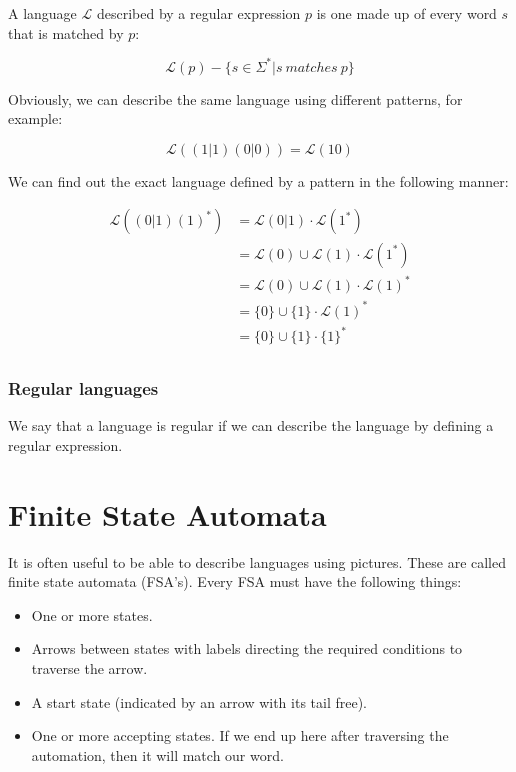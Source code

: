 A language $\mathcal{L}$ described by a regular expression $p$ is one made up of
every word $s$ that is matched by $p$:

\[
  \mathcal{L}(p) - \{s \in \Sigma^* | s~matches~p\}
\]

Obviously, we can describe the same language using different patterns, for
example:

\[
  \mathcal{L}((1|1)(0|0)) = \mathcal{L}(10)
\]

We can find out the exact language defined by a pattern in the following manner:

\[
  \begin{split}
    \mathcal{L}((0|1)(1)^*) &= \mathcal{L}(0|1) \cdot \mathcal{L}(1^*)\\
                &= \mathcal{L}(0) \cup \mathcal{L}(1) \cdot \mathcal{L}(1^*)\\
                &= \mathcal{L}(0) \cup \mathcal{L}(1) \cdot \mathcal{L}(1)^*\\
                &= \{0\} \cup \{1\} \cdot \mathcal{L}(1)^*\\
                &= \{0\} \cup \{1\} \cdot \{1\}^*\\
  \end{split}
\]

\subsubsection{Regular languages}

We say that a language is regular if we can describe the language by defining a
regular expression.

\section{Finite State Automata}

It is often useful to be able to describe languages using pictures. These are
called finite state automata (FSA's). Every FSA must have the following things:

\begin{itemize}
  \item One or more states.
  \item Arrows between states with labels directing the required conditions to
      traverse the arrow.
  \item A start state (indicated by an arrow with its tail free).
  \item One or more accepting states. If we end up here after traversing the
      automation, then it will match our word.
\end{itemize}

